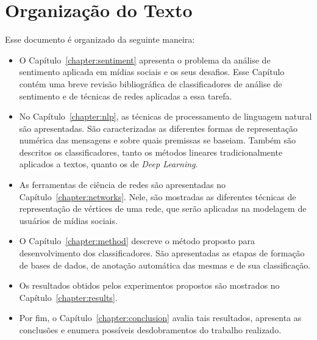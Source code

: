 \section{Organização do Texto}

Esse documento é organizado da seguinte maneira:

\begin{itemize}
    \item O Capítulo~\ref{chapter:sentiment} apresenta o problema da análise
        de sentimento aplicada em mídias sociais e os seus desafios.
        Esse Capítulo contém uma breve revisão bibliográfica de classificadores
        de análise de sentimento e de técnicas de redes aplicadas a essa tarefa.
    \item No Capítulo~\ref{chapter:nlp}, as técnicas de processamento de
        linguagem natural são apresentadas.
        São caracterizadas as diferentes formas de representação numérica das
        mensagens e sobre quais premissas se baseiam.
        Também são descritos os classificadores, tanto os métodos lineares
        tradicionalmente aplicados a textos, quanto os de \textit{Deep Learning}.
    \item As ferramentas de ciência de redes são apresentadas no
        Capítulo~\ref{chapter:networks}.
        Nele, são mostradas as diferentes técnicas de representação de
        vértices de uma rede, que serão aplicadas na modelagem de usuários de
        mídias sociais.
    \item O Capítulo~\ref{chapter:method} descreve o método proposto para
        desenvolvimento dos classificadores.
        São apresentadas as etapas de formação de bases de dados, de anotação
        automática das mesmas e de sua classificação.
    \item Os resultados obtidos pelos experimentos propostos são mostrados
        no Capítulo~\ref{chapter:results}.
    \item Por fim, o Capítulo~\ref{chapter:conclusion} avalia tais resultados,
        apresenta as conclusões e enumera possíveis desdobramentos do
        trabalho realizado.
\end{itemize}
